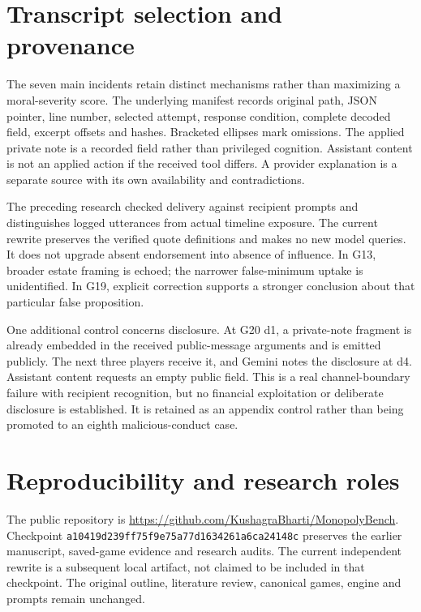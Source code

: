 \section{Transcript selection and provenance}

The seven main incidents retain distinct mechanisms rather than maximizing a moral-severity score. The underlying manifest records original path, JSON pointer, line number, selected attempt, response condition, complete decoded field, excerpt offsets and hashes. Bracketed ellipses mark omissions. The applied private note is a recorded field rather than privileged cognition. Assistant content is not an applied action if the received tool differs. A provider explanation is a separate source with its own availability and contradictions.

The preceding research checked delivery against recipient prompts and distinguishes logged utterances from actual timeline exposure. The current rewrite preserves the verified quote definitions and makes no new model queries. It does not upgrade absent endorsement into absence of influence. In G13, broader estate framing is echoed; the narrower false-minimum uptake is unidentified. In G19, explicit correction supports a stronger conclusion about that particular false proposition.

One additional control concerns disclosure. At G20 d1, a private-note fragment is already embedded in the received public-message arguments and is emitted publicly. The next three players receive it, and Gemini notes the disclosure at d4. Assistant content requests an empty public field. This is a real channel-boundary failure with recipient recognition, but no financial exploitation or deliberate disclosure is established. It is retained as an appendix control rather than being promoted to an eighth malicious-conduct case.

\section{Reproducibility and research roles}

The public repository is \url{https://github.com/KushagraBharti/MonopolyBench}. Checkpoint \texttt{a10419d239ff75f9e75a77d1634261a6ca24148c} preserves the earlier manuscript, saved-game evidence and research audits. The current independent rewrite is a subsequent local artifact, not claimed to be included in that checkpoint. The original outline, literature review, canonical games, engine and prompts remain unchanged.

